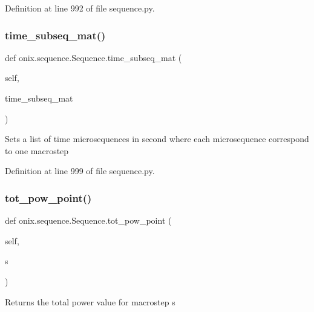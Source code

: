 Definition at line 992 of file sequence.\+py.

\mbox{\label{classonix_1_1sequence_1_1Sequence_a9e1f8750228a3af64160d1e79de4d2bc}} 
\subsubsection{\texorpdfstring{time\+\_\+subseq\+\_\+mat()}{time\_subseq\_mat()}\hspace{0.1cm}{\footnotesize\ttfamily [2/2]}}
{\footnotesize\ttfamily def onix.\+sequence.\+Sequence.\+time\+\_\+subseq\+\_\+mat (\begin{DoxyParamCaption}\item[{}]{self,  }\item[{}]{time\+\_\+subseq\+\_\+mat }\end{DoxyParamCaption})}

\begin{DoxyVerb}Sets a list of time microsequences in second where each microsequence correspond 
to one macrostep
\end{DoxyVerb}
 

Definition at line 999 of file sequence.\+py.

\mbox{\label{classonix_1_1sequence_1_1Sequence_a9adfb234a40f3b3b09cf3bab0389f31b}} 
\subsubsection{\texorpdfstring{tot\+\_\+pow\+\_\+point()}{tot\_pow\_point()}}
{\footnotesize\ttfamily def onix.\+sequence.\+Sequence.\+tot\+\_\+pow\+\_\+point (\begin{DoxyParamCaption}\item[{}]{self,  }\item[{}]{s }\end{DoxyParamCaption})}

\begin{DoxyVerb}Returns the total power value for macrostep s
\end{DoxyVerb}
 

